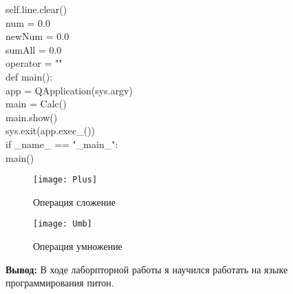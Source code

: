         self.line.clear()\\

        num = 0.0\\
        newNum = 0.0\\
        sumAll = 0.0\\
        operator = ""\\

def main():\\
    app = QApplication(sys.argv)\\
    main = Calc()\\
    main.show()\\
    sys.exit(app.exec\_())\\

if \_name\_ == "\_main\_":\\
    main()\\



\begin{figure}[]%
\centering
\texttt{[image: Plus]}
\caption{Операция сложение }
\label{fig:Plus}
\end{figure}

\begin{figure}[]%
\centering
\texttt{[image: Umb]}
\caption{Операция умножение}
\label{fig:Umb}
\end{figure}

\newpage
\textbf{Вывод:}
В ходе лаборпторной работы я научился работать на языке программирования питон.




